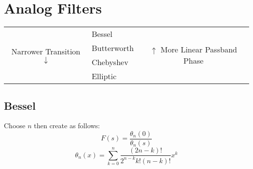 \documentclass[11pt, oneside]{article}
\newcommand{\tabitem}{~~\llap{\textbullet}~~}
\begin{document}
\section{Analog Filters}

\begin{table}[h]
\centering
\begin{tabular}{ccc}
        \multirow{4}{*}{Narrower Transition $\downarrow$} & \multicolumn{1}{l}{Bessel} & \multirow{4}{*}{$\uparrow$ More Linear Passband Phase}\\
        & \multicolumn{1}{l}{Butterworth} \\
        & \multicolumn{1}{l}{Chebyshev} \\
        & \multicolumn{1}{l}{Elliptic} \\
\end{tabular}
\end{table}


\subsection{Bessel}
Choose $n$ then create as follows:
\[ F(s) = \frac{\theta_n(0)}{\theta_n(s)}\]
\[ \theta_n(x) = \sum_{k=0}^{n} \frac{(2n-k)!}{2^{n-k}k!(n-k)!}x^k \]
\end{document}

